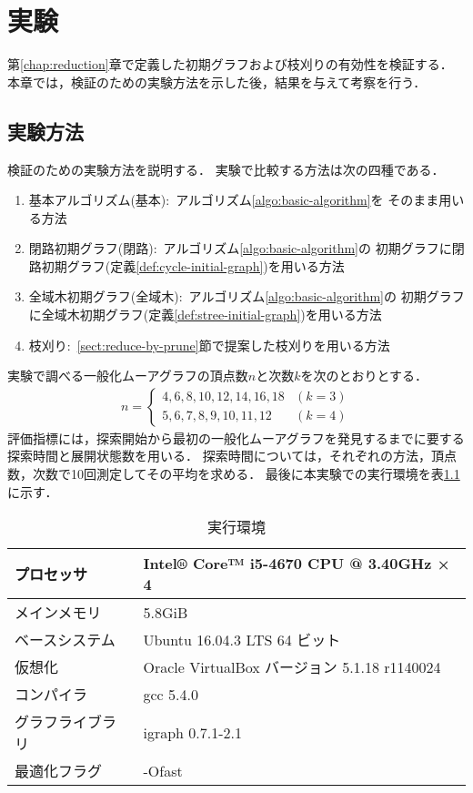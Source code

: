 
\chapter{実験}
\label{sect:experiment}
第\ref{chap:reduction}章で定義した初期グラフおよび枝刈りの有効性を検証する．
本章では，検証のための実験方法を示した後，結果を与えて考察を行う．

\section{実験方法}
検証のための実験方法を説明する．
実験で比較する方法は次の四種である．
\begin{enumerate}
\item 基本アルゴリズム(基本):\ アルゴリズム\ref{algo:basic-algorithm}を
  そのまま用いる方法
\item 閉路初期グラフ(閉路):\ アルゴリズム\ref{algo:basic-algorithm}の
  初期グラフに閉路初期グラフ(定義\ref{def:cycle-initial-graph})を用いる方法
\item 全域木初期グラフ(全域木):\ アルゴリズム\ref{algo:basic-algorithm}の
  初期グラフに全域木初期グラフ(定義\ref{def:stree-initial-graph})を用いる方法
\item 枝刈り:\ \ref{sect:reduce-by-prune}節で提案した枝刈りを用いる方法
\end{enumerate}
実験で調べる一般化ムーアグラフの頂点数$n$と次数$k$を次のとおりとする．
\begin{equation*}
  \begin{aligned}
    n=\begin{cases}
      4,6,8,10,12,14,16,18 & (k=3) \\
      5,6,7,8,9,10,11,12 & (k=4)
    \end{cases}
  \end{aligned}
\end{equation*}
評価指標には，探索開始から最初の一般化ムーアグラフを発見するまでに要する
探索時間と展開状態数を用いる．
探索時間については，それぞれの方法，頂点数，次数で10回測定してその平均を求める．
最後に本実験での実行環境を表\ref{tab:env-lab}に示す．
\begin{table}
  \caption{実行環境}
  \label{tab:env-lab}
  \centering
  \begin{tabular}{ll}
    \hline
    プロセッサ & Intel® Core™ i5-4670 CPU @ 3.40GHz × 4 \\ \hline
    メインメモリ & 5.8GiB \\ \hline
    ベースシステム & Ubuntu 16.04.3 LTS 64 ビット \\ \hline
    仮想化 & Oracle VirtualBox バージョン 5.1.18 r1140024 \\ \hline
    コンパイラ & gcc 5.4.0 \\ \hline
    グラフライブラリ & igraph 0.7.1-2.1 \\ \hline
    最適化フラグ & -Ofast \\ \hline
  \end{tabular}
\end{table}

